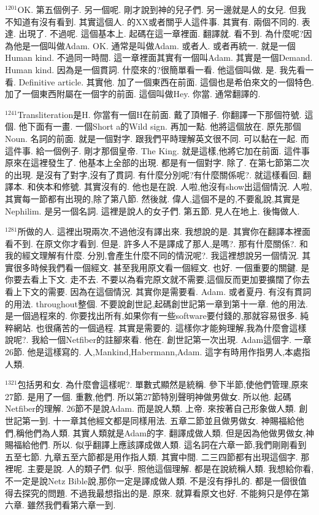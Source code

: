 \documentclass{book}
\begin{document}
$^{1201}$OK.
第五個例子.
另一個呢.
剛才說到神的兒子們.
另一邊就是人的女兒.
但我不知道有沒有看到.
其實這個人.
的XX或者關乎人這件事.
其實有.
兩個不同的.
表達.
出現了.
不過呢.
這個基本上.
起碼在這一章裡面.
翻譯就.
看不到.
為什麼呢?因為他是一個叫做Adam.
OK.
通常是叫做Adam.
或者人.
或者再統一.
就是一個Human kind.
不過同一時間.
這一章裡面其實有一個叫Adam.
其實是一個Demand.
Human kind.
因為是一個貫詞.
什麼來的?很簡單看一看.
他這個叫做.
是.
我先看一看.
Definitive article.
其實他.
加了一個東西在前面.
這個也是希伯來文的一個特色.
加了一個東西附屬在一個字的前面.
這個叫做Hey.
你當.
通常翻譯的.

$^{1241}$Transliteration是H.
你當有一個H在前面.
戴了頂帽子.
你翻譯一下那個符號.
這個.
他下面有一畫.
一個Short a的Wild sign.
再加一點.
他將這個放在.
原先那個Noun.
名詞的前面.
就是一個對字.
跟我們平時理解英文很不同.
可以黏在一起.
而這件事.
給一個例子.
剛才那個皇帝.
The King.
就是這樣,他將它加在前面.
這件事原來在這裡發生了.
他基本上全部的出現.
都是有一個對字.
除了.
在第七節第二次的出現.
是沒有了對字,沒有了貫詞.
有什麼分別呢?有什麼關係呢?.
就這樣看回.
翻譯本.
和俠本和修號.
其實沒有的.
他也是在說.
人啦,他沒有show出這個情況.
人啦,其實每一節都有出現的,除了第八節.
然後就.
偉人,這個不是的,不要亂說,其實是Nephilim.
是另一個名詞.
這裡是說人的女子們.
第五節.
見人在地上.
後悔做人.

$^{1281}$所做的人.
這裡出現兩次,不過他沒有譯出來.
我想說的是.
其實你在翻譯本裡面看不到.
在原文你才看到.
但是.
許多人不是譯成了那人,是嗎?.
那有什麼關係?.
和我的經文理解有什麼.
分別,會產生什麼不同的情況呢?.
我這裡想說另一個情況.
其實很多時候我們看一個經文.
甚至我用原文看一個經文.
也好.
一個重要的關鍵.
是你要去看上下文.
走不去.
不要以為看完原文就不需要,這個反而更加要擴闊了你去看上下文的需要.
因為在這個情況.
其實你是需要看.
Adam.
或者夏丹.
有沒有貫詞的用法.
throughout整個.
不要說創世記,起碼創世記第一章到第十一章.
他的用法.
是一個過程來的.
你要找出所有,如果你有一些software要付錢的,那就容易很多.
純粹網站.
也很痛苦的一個過程.
其實是需要的.
這樣你才能夠理解,我為什麼會這樣說呢?.
我給一個Netfiber的註腳來看.
他在.
創世記第一次出現.
Adam這個字.
一章26節.
他是這樣寫的.
人,Mankind,Habermann,Adam.
這字有時用作指男人,本處指人類.

$^{1321}$包括男和女.
為什麼會這樣呢?.
單數式顯然是統稱.
參下半節,使他們管理,原來27節.
是用了一個.
重數,他們.
所以第27節特別聲明神做男做女.
所以他.
起碼Netfiber的理解.
26節不是說Adam.
而是說人類.
上帝.
來按著自己形象做人類.
創世記第一到.
十一章其他經文都是同樣用法.
五章二節並且做男做女.
神賜福給他們,稱他們為人類.
其實人類就是Adam的字.
翻譯成做人類.
但是因為他做男做女,神賜福給他們.
所以.
似乎翻譯上應該譯成做人類.
這名詞在六章一節,我們剛剛看到五至七節.
九章五至六節都是用作指人類.
其實中間.
二三四節都有出現這個字.
那裡呢.
主要是說.
人的類子們.
似乎.
照他這個理解.
都是在說統稱人類.
我想給你看,不一定是說Netz Bible說,那你一定是譯成做人類.
不是沒有掙扎的.
都是一個很值得去探究的問題.
不過我最想指出的是.
原來.
就算看原文也好.
不能夠只是停在第六章.
雖然我們看第六章一到.
\end{document}
